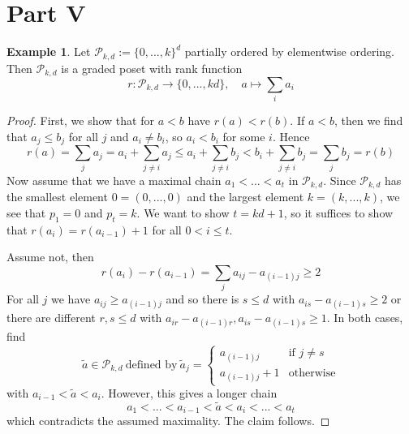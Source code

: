 \documentclass{scrartcl}
\theoremstyle{definition}
\newtheorem{example}[definition]{Example}
\begin{document}
\section{Part V}
\begin{example}
    Let $\mathcal{P}_{k, d} := \{ 0, ..., k \}^d$ partially ordered by elementwise ordering.
    Then $\mathcal{P}_{k, d}$ is a graded poset with rank function
    \begin{equation*}
        r: \mathcal{P}_{k, d} \to \{ 0, ..., kd \}, \quad a \mapsto \sum_i a_i
    \end{equation*}
\end{example}
\begin{proof}
    First, we show that for $a < b$ have $r(a) < r(b)$.
    If $a < b$, then we find that $a_j \leq b_j$ for all $j$ and $a_i \neq b_i$, so $a_i < b_i$ for some $i$.
    Hence
    \begin{equation*}
        r(a) = \sum_j a_j = a_i + \sum_{j \neq i} a_j \leq a_i + \sum_{j \neq i} b_j < b_i + \sum_{j \neq i} b_j = \sum_j b_j = r(b)
    \end{equation*}
    Now assume that we have a maximal chain $a_1 < ... < a_t$ in $\mathcal{P}_{k, d}$.
    Since $\mathcal{P}_{k, d}$ has the smallest element $0 = (0, ..., 0)$ and the largest element $k = (k, ..., k)$, we see that $p_1 = 0$ and $p_t = k$.
    We want to show $t = kd + 1$, so it suffices to show that $r(a_i) = r(a_{i - 1}) + 1$ for all $0 < i \leq t$.

    Assume not, then 
    \begin{equation*}
        r(a_i) - r(a_{i - 1}) = \sum_j a_{ij} - a_{(i - 1)j} \geq 2
    \end{equation*}
    For all $j$ we have $a_{ij} \geq a_{(i - 1)j}$ and so there is $s \leq d$ with $a_{is} - a_{(i - 1)s} \geq 2$ or there are different $r, s \leq d$ with $a_{ir} - a_{(i - 1)r}, a_{is} - a_{(i - 1)s} \geq 1$.
    In both cases, find
    \begin{equation*}
        \tilde{a} \in \mathcal{P}_{k, d} \ \text{defined by} \ \tilde{a}_j = \begin{cases}
            a_{(i - 1)j} & \text{if $j \neq s$} \\
            a_{(i - 1)j} + 1 & \text{otherwise}
        \end{cases}
    \end{equation*}
    with $a_{i - 1} < \tilde{a} < a_i$. However, this gives a longer chain
    \begin{equation*}
        a_1 < ... < a_{i - 1} < \tilde{a} < a_i < ... < a_t
    \end{equation*}
    which contradicts the assumed maximality. The claim follows.
\end{proof}
\end{document}
